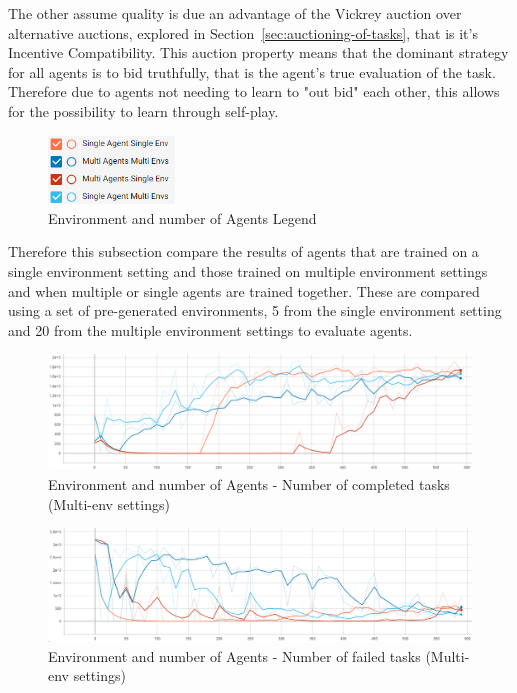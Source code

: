 The other assume quality is due an advantage of the Vickrey auction over alternative auctions, explored in
Section~\ref{sec:auctioning-of-tasks}, that is it's Incentive Compatibility. This auction property means that the
dominant strategy for all agents is to bid truthfully, that is the agent's true evaluation of the task. Therefore due
to agents not needing to learn to "out bid" each other, this allows for the possibility to learn through self-play.

\begin{figure}
    \includegraphics[width=0.3\textwidth]{figures/5_evaluation_figs/env_agent_num_training_fig/legend.png}
    \caption{Environment and number of Agents Legend}
    \label{fig:env-training-legend}
\end{figure}

Therefore this subsection compare the results of agents that are trained on a single environment setting and those
trained on multiple environment settings and when multiple or single agents are trained together. These are compared
using a set of pre-generated environments, 5 from the single environment setting and 20 from the multiple
environment settings to evaluate agents.

\begin{figure}[H]
    \centering
    \includegraphics[width=\linewidth]{figures/5_evaluation_figs/env_agent_num_training_fig/num_completed_tasks.png}
    \caption{Environment and number of Agents - Number of completed tasks (Multi-env settings)}
    \label{fig:env_num_completed_tasks}
\end{figure}

\begin{figure}[H]
    \centering
    \includegraphics[width=\linewidth]{figures/5_evaluation_figs/env_agent_num_training_fig/num_failed_tasks.png}
    \caption{Environment and number of Agents - Number of failed tasks (Multi-env settings)}
    \label{fig:env_num_failed_tasks}
\end{figure}


